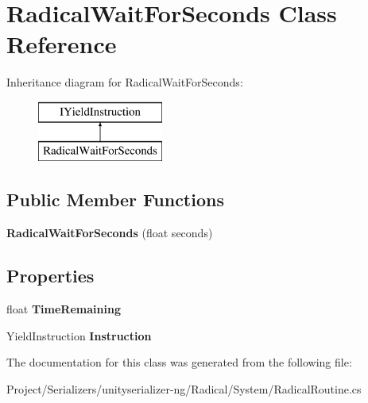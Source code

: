 \hypertarget{class_radical_wait_for_seconds}{}\section{Radical\+Wait\+For\+Seconds Class Reference}
\label{class_radical_wait_for_seconds}
Inheritance diagram for Radical\+Wait\+For\+Seconds\+:\begin{figure}[H]
\begin{center}
\leavevmode
\includegraphics[height=2.000000cm]{class_radical_wait_for_seconds}
\end{center}
\end{figure}
\subsection*{Public Member Functions}
\begin{DoxyCompactItemize}
\item 
\mbox{\label{class_radical_wait_for_seconds_a94164a7e1714d2aaafb429d3d397b208}} 
{\bfseries Radical\+Wait\+For\+Seconds} (float seconds)
\end{DoxyCompactItemize}
\subsection*{Properties}
\begin{DoxyCompactItemize}
\item 
\mbox{\label{class_radical_wait_for_seconds_a748691ff223a1bdfba6514e04b8b12c6}} 
float {\bfseries Time\+Remaining}
\item 
\mbox{\label{class_radical_wait_for_seconds_af83ead2c5d678ce93fb5799798e1f4d0}} 
Yield\+Instruction {\bfseries Instruction}
\end{DoxyCompactItemize}


The documentation for this class was generated from the following file\+:\begin{DoxyCompactItemize}
\item 
Project/\+Serializers/unityserializer-\/ng/\+Radical/\+System/Radical\+Routine.\+cs\end{DoxyCompactItemize}
